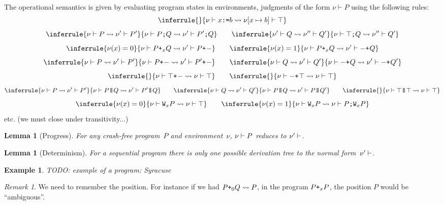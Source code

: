 \documentclass[a4paper]{article}
\theoremstyle{theorem}
\newtheorem{lemma}[theorem]{Lemma}
\theoremstyle{example}
\newtheorem{example}[theorem]{Example}
\theoremstyle{remark}
\newtheorem{remark}[theorem]{Remark}
\begin{document}
The operational semantics is given by evaluating program states in environments,
\ie judgments of the form $\nu\vdash P$ using the following rules:
\[
  \inferrule{\null}{\penv{\nu}{\pset xb}\redto\penv{\nu[x\mapsto b]}{\pskip}}
\]
\[
  \inferrule{\penv\nu P\redto\penv{\nu'}{P'}}{\penv{\nu}{\pseq PQ}\redto\penv{\nu'}{\pseq{P'}{Q}}}
  \qquad
  \inferrule{\penv{\nu'}{Q}\redto\penv{\nu''}{Q'}}{\penv{\nu}{\pseq \pskip Q}\redto\penv{\nu''}{Q'}}
\]
\[
  \inferrule{\nu(x)=\Bfalse}{\penv{\nu}{\por xPQ}\redto\penv{\nu'}{\porl P}}
  \qquad
  \inferrule{\nu(x)=\Btrue}{\penv{\nu}{\por xPQ}\redto\penv{\nu'}{\porr Q}}
\]
\[
  \inferrule{\penv\nu P\redto\penv{\nu'}{P'}}{\penv{\nu}{\porl P}\redto\penv{\nu'}{\porl{P'}}}
  \qquad
  \inferrule{\penv\nu Q\redto\penv{\nu'}{Q'}}{\penv{\nu}{\porr Q}\redto\penv{\nu'}{\porr{Q'}}}
\]
\[
  \inferrule{\null}{\penv{\nu}{\porl\pskip}\redto\penv{\nu}{\pskip}}
  \qquad
  \inferrule{\null}{\penv{\nu}{\porr\pskip}\redto\penv{\nu}{\pskip}}
\]
\[
  \inferrule{\penv\nu P\redto\penv{\nu'}{P'}}{\penv{\nu}{\ppar PQ}\redto\penv{\nu'}{\ppar{P'}{Q}}}
  \qquad
  \inferrule{\penv\nu Q\redto\penv{\nu'}{Q'}}{\penv{\nu}{\ppar PQ}\redto\penv{\nu'}{\ppar{P}{Q'}}}
  \qquad
  \inferrule{\null}{\penv\nu{\ppar\pskip\pskip}\redto\penv\nu\pskip}
\]
\[
  \inferrule{\nu(x)=\Bfalse}{\penv\nu{\pwhile xP}\redto\penv\nu\pskip}
  \qquad
  \inferrule{\nu(x)=\Btrue}{\penv\nu{\pwhile xP}\redto\penv\nu{\pseq{P}{\pwhile xP}}}
\]
etc. (we must close under transitivity...)


\begin{lemma}[Progress]
  For any crash-free program~$P$ and environment~$\nu$, $\penv\nu P$ reduces to
  $\penv{\nu'}{}$.
\end{lemma}

\begin{lemma}[Determinism]
  For a sequential program there is only one possible derivation tree to the
  normal form~$\penv{\nu'}{}$.
\end{lemma}

\begin{example}
  TODO: example of a program: Syracuse
\end{example}

\begin{remark}
  We need to remember the position. For instance if we had
  $\por\Bfalse PQ\redto P$, in the program $\por xPP$, the position $P$ would be
  ``ambiguous''.
\end{remark}
\end{document}
